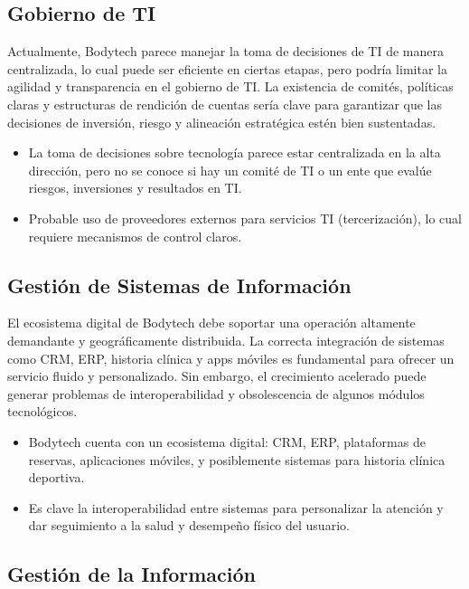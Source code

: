 \subsection{Gobierno de TI}

Actualmente, Bodytech parece manejar la toma de decisiones de TI de manera centralizada, lo cual puede ser eficiente en ciertas etapas, pero podría limitar la agilidad y transparencia en el gobierno de TI. La existencia de comités, políticas claras y estructuras de rendición de cuentas sería clave para garantizar que las decisiones de inversión, riesgo y alineación estratégica estén bien sustentadas.

\begin{itemize}
  \item La toma de decisiones sobre tecnología parece estar centralizada en la alta dirección, pero no se conoce si hay un comité de TI o un ente que evalúe riesgos, inversiones y resultados en TI.
  \item Probable uso de proveedores externos para servicios TI (tercerización), lo cual requiere mecanismos de control claros.
\end{itemize}

\subsection{Gestión de Sistemas de Información}

El ecosistema digital de Bodytech debe soportar una operación altamente demandante y geográficamente distribuida. La correcta integración de sistemas como CRM, ERP, historia clínica y apps móviles es fundamental para ofrecer un servicio fluido y personalizado. Sin embargo, el crecimiento acelerado puede generar problemas de interoperabilidad y obsolescencia de algunos módulos tecnológicos.

\begin{itemize}
  \item Bodytech cuenta con un ecosistema digital: CRM, ERP, plataformas de reservas, aplicaciones móviles, y posiblemente sistemas para historia clínica deportiva.
  \item Es clave la interoperabilidad entre sistemas para personalizar la atención y dar seguimiento a la salud y desempeño físico del usuario.
\end{itemize}

\subsection{Gestión de la Información}

